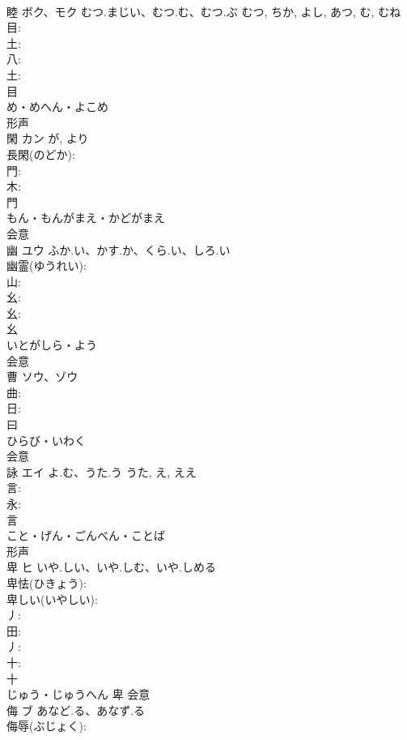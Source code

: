 \documentclass[8pt]{extreport}
\begin{document}
\begin{CJK}{UTF8}{min}
\\	睦	ボク、モク	むつ.まじい、むつ.む、むつ.ぶ	むつ, ちか, よし, あつ, む, むね	
\\	目: 
\\	土: 
\\	八: 
\\	土: 
\\	目	
\\	め・めへん・よこめ	
\\	形声 
\\	閑	カン		が, より	
\\	長閑(のどか): 
\\	門: 
\\	木: 
\\	門	
\\	もん・もんがまえ・かどがまえ	
\\	会意 
\\	幽	ユウ	ふか.い、かす.か、くら.い、しろ.い		
\\	幽霊(ゆうれい): 
\\	山: 
\\	幺: 
\\	幺: 
\\	幺	
\\	いとがしら・よう	
\\	会意 
\\	曹	ソウ、ゾウ			
\\	曲: 
\\	日: 
\\	曰	
\\	ひらび・いわく	
\\	会意 
\\	詠	エイ	よ.む、うた.う	うた, え, ええ	
\\	言: 
\\	永: 
\\	言	
\\	こと・げん・ごんべん・ことば	
\\	形声 
\\	卑	ヒ	いや.しい、いや.しむ、いや.しめる		
\\	卑怯(ひきょう): 
\\	卑しい(いやしい): 
\\	丿: 
\\	田: 
\\	丿: 
\\	十: 
\\	十	
\\	じゅう・じゅうへん	卑	会意 
\\	侮	ブ	あなど.る、あなず.る		
\\	侮辱(ぶじょく): 

\end{CJK}
\end{document}
